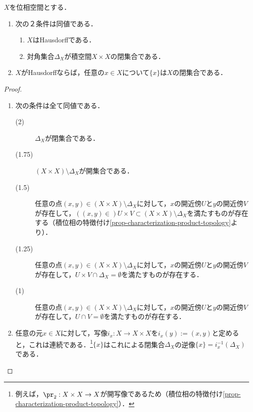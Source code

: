 \documentclass[uplatex,dvipdfmx]{jsreport}
\begin{document}
\begin{proposition}\label{prop-characterization-Hausdorff}
    $X$を位相空間とする．
    \begin{enumerate}
        \item 次の２条件は同値である．
        \begin{enumerate}[(1)]
            \item $X$はHausdorffである．
            \item 対角集合$\Delta_X$が積空間$X\times X$の閉集合である．
        \end{enumerate}
        \item $X$がHausdorffならば，任意の$x\in X$について$\{x\}$は$X$の閉集合である．
    \end{enumerate}
\end{proposition}
\begin{proof}\mbox{}
    \begin{enumerate}
        \item 次の条件は全て同値である．
        \begin{description}
            \item[(2)] $\Delta_X$が閉集合である．
            \item[(1.75)] $(X\times X)\setminus\Delta_X$が開集合である．
            \item[(1.5)] 任意の点$(x,y)\in(X\times X)\setminus\Delta_X$に対して，$x$の開近傍$U$と$y$の開近傍$V$が存在して，$((x,y)\in )U\times V\subset (X\times X)\setminus\Delta_X$を満たすものが存在する（積位相の特徴付け\ref{prop-characterization-product-topology}より）．
            \item[(1.25)] 任意の点$(x,y)\in(X\times X)\setminus\Delta_X$に対して，$x$の開近傍$U$と$y$の開近傍$V$が存在して，$U\times V\cap\Delta_X=\emptyset$を満たすものが存在する．
            \item[(1)] 任意の点$(x,y)\in(X\times X)\setminus\Delta_X$に対して，$x$の開近傍$U$と$y$の開近傍$V$が存在して，$U\cap V=\emptyset$を満たすものが存在する．
        \end{description}
        \item 任意の元$x\in X$に対して，写像$i_x:X\to X\times X$を$i_x(y):=(x,y)$と定めると，これは連続である．\footnote{例えば，$\pr_2:X\times X\to X$が開写像であるため（積位相の特徴付け\ref{prop-characterization-product-topology}）．}$\{x\}$はこれによる閉集合$\Delta_X$の逆像$\{x\}=i^{-1}_x(\Delta_X)$である．
    \end{enumerate}
\end{proof}
\end{document}
